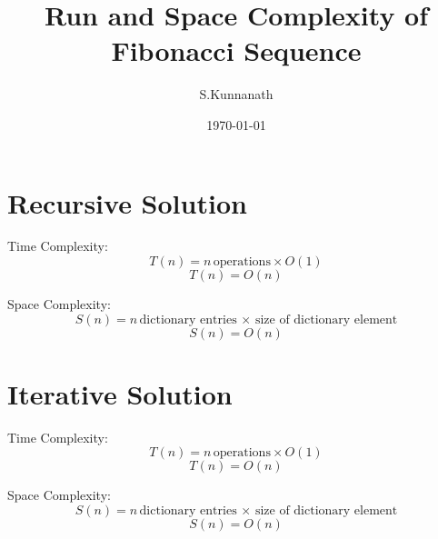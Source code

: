 \documentclass{article}
\title{Run and Space Complexity of Fibonacci Sequence}
\author{S.Kunnanath}
\date{\today}
\begin{document}
\maketitle

\section{Recursive Solution}

Time Complexity:
\[T(n) = n \, \textrm{operations} \times  O(1) \]
\[T(n) = O(n) \]

Space Complexity:
\[S(n) = n \, \textrm{dictionary entries} \, \times \, \textrm{size of dictionary element} \]
\[S(n) = O(n) \]

\section{Iterative Solution}

Time Complexity:
\[T(n) = n \, \textrm{operations} \times  O(1) \]
\[T(n) = O(n) \]

Space Complexity:
\[S(n) = n \, \textrm{dictionary entries} \, \times \, \textrm{size of dictionary element} \]
\[S(n) = O(n) \]
\end{document}
